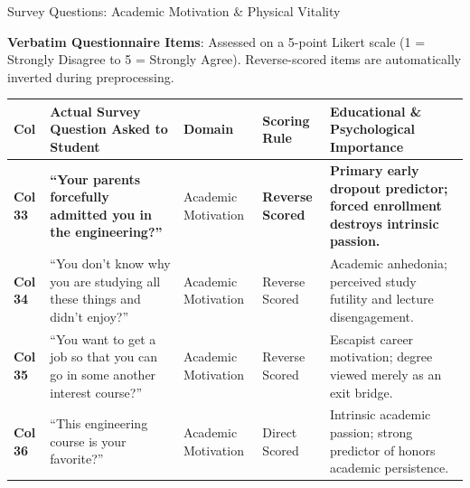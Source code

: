 \documentclass{beamer}
\begin{document}
\begin{frame}[t]{Survey Questions: Academic Motivation \& Physical Vitality}
  \vspace{-0.20cm}
  \begin{topsummarybar}
    \fontsize{5.8pt}{7.0pt}\selectfont
    \textbf{\color{NavyDark}Verbatim Questionnaire Items}: Assessed on a 5-point Likert scale (1 = Strongly Disagree to 5 = Strongly Agree). Reverse-scored items are automatically inverted during preprocessing.
  \end{topsummarybar}
  \vspace{-0.25cm}

  \begin{tcolorbox}[colback=white, colframe=BlueDeep, arc=1.2mm, boxrule=0.7pt, top=0.3mm, bottom=0.3mm, left=0.8mm, right=0.8mm]
    \fontsize{4.2pt}{5.0pt}\selectfont
    \renewcommand{\arraystretch}{0.55}
    \begin{tabularx}{\linewidth}{@{}p{0.7cm} p{4.2cm} p{1.6cm} p{1.6cm} X@{}}
      \toprule
      \rowcolor{NavyDark}
      \textbf{\color{white}Col} & \textbf{\color{white}Actual Survey Question Asked to Student} & \textbf{\color{white}Domain} & \textbf{\color{white}Scoring Rule} & \textbf{\color{white}Educational \& Psychological Importance} \\
      \midrule
      \rowcolor{GoldBG} \textbf{Col 33} & \textbf{``Your parents forcefully admitted you in the engineering?''} & Academic Motivation & \textbf{Reverse Scored} & \textbf{Primary early dropout predictor; forced enrollment destroys intrinsic passion.} \\
      \rowcolor{BlueLight} \textbf{Col 34} & ``You don't know why you are studying all these things and didn't enjoy?'' & Academic Motivation & Reverse Scored & Academic anhedonia; perceived study futility and lecture disengagement. \\
      \rowcolor{CanvasBG} \textbf{Col 35} & ``You want to get a job so that you can go in some another interest course?'' & Academic Motivation & Reverse Scored & Escapist career motivation; degree viewed merely as an exit bridge. \\
      \rowcolor{BlueLight} \textbf{Col 36} & ``This engineering course is your favorite?'' & Academic Motivation & Direct Scored & Intrinsic academic passion; strong predictor of honors academic persistence. \\

\end{tabularx}
\end{tcolorbox}
\end{frame}
\end{document}
